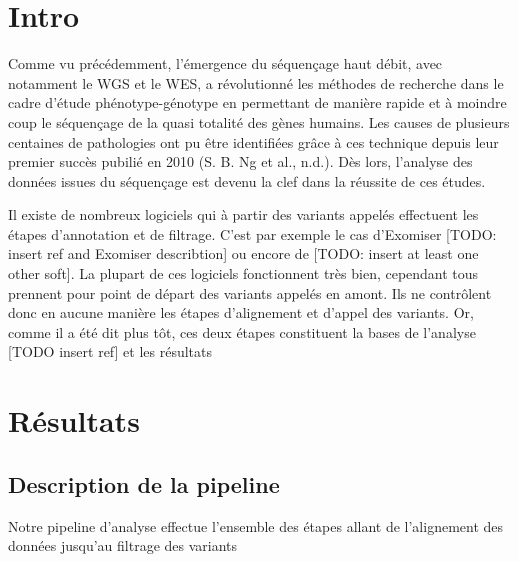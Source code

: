 \documentclass[12pt,twoside]{reedthesis}
\theoremstyle{definition}
\theoremstyle{definition}
\theoremstyle{remark}
\begin{document}
  \section{Intro}\label{intro}
  
  Comme vu précédemment, l'émergence du séquençage haut débit, avec
  notamment le WGS et le WES, a révolutionné les méthodes de recherche
  dans le cadre d'étude phénotype-génotype en permettant de manière rapide
  et à moindre coup le séquençage de la quasi totalité des gènes humains.
  Les causes de plusieurs centaines de pathologies ont pu être identifiées
  grâce à ces technique depuis leur premier succès pubilié en 2010 (S. B.
  Ng et al., n.d.). Dès lors, l'analyse des données issues du séquençage
  est devenu la clef dans la réussite de ces études.
  
  Il existe de nombreux logiciels qui à partir des variants appelés
  effectuent les étapes d'annotation et de filtrage. C'est par exemple le
  cas d'Exomiser {[}TODO: insert ref and Exomiser describtion{]} ou encore
  de {[}TODO: insert at least one other soft{]}. La plupart de ces
  logiciels fonctionnent très bien, cependant tous prennent pour point de
  départ des variants appelés en amont. Ils ne contrôlent donc en aucune
  manière les étapes d'alignement et d'appel des variants. Or, comme il a
  été dit plus tôt, ces deux étapes constituent la bases de l'analyse
  {[}TODO insert ref{]} et les résultats
  
  \section{Résultats}\label{resultats}
  
  \subsection{Description de la
  pipeline}\label{description-de-la-pipeline}
  
  Notre pipeline d'analyse effectue l'ensemble des étapes allant de
  l'alignement des données jusqu'au filtrage des variants
  
\end{document}
